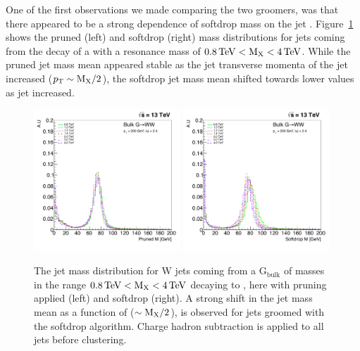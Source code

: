 One of the first observations we made comparing the two groomers, was that there appeared to be a strong dependence of softdrop mass on the jet \PT. Figure~\ref{fig:searchI:grommedmassshift} shows the pruned (left) and softdrop (right) mass distributions for \PW jets coming from the decay of a \BulkG with a resonance mass of $0.8 \,\text{Te\hspace{-.08em}V} < \text{M}_{\text{X}} < 4 \,\text{Te\hspace{-.08em}V}$. While the pruned jet mass mean appeared stable as the jet transverse momenta of the jet increased ($p_{\mathrm{T}}\sim\text{M}_{\text{X}}/2$), the softdrop jet mass mean shifted towards lower values as jet \PT increased.



\begin{figure}[h!]
\centering
\includegraphics[width=0.49\textwidth]{figures/analysis/search1/misc/pruned_mass_shift.pdf}
\includegraphics[width=0.49\textwidth]{figures/analysis/search1/misc/softdrop_mass_shift.pdf}
\caption{The jet mass distribution for W jets coming from a $\textrm{G}_{\textrm{bulk}}$ of masses in the range $0.8 \,\text{Te\hspace{-.08em}V} < \text{M}_{\text{X}} < 4 \,\text{Te\hspace{-.08em}V}$ decaying to \WW, here with pruning applied (left) and softdrop (right). A strong shift in the jet mass mean as a function of \PT ($\sim\text{M}_{\text{X}}/2$), is observed for jets groomed with the softdrop algorithm. Charge hadron subtraction is applied to all jets before clustering.}
\label{fig:searchI:grommedmassshift}
\end{figure}

